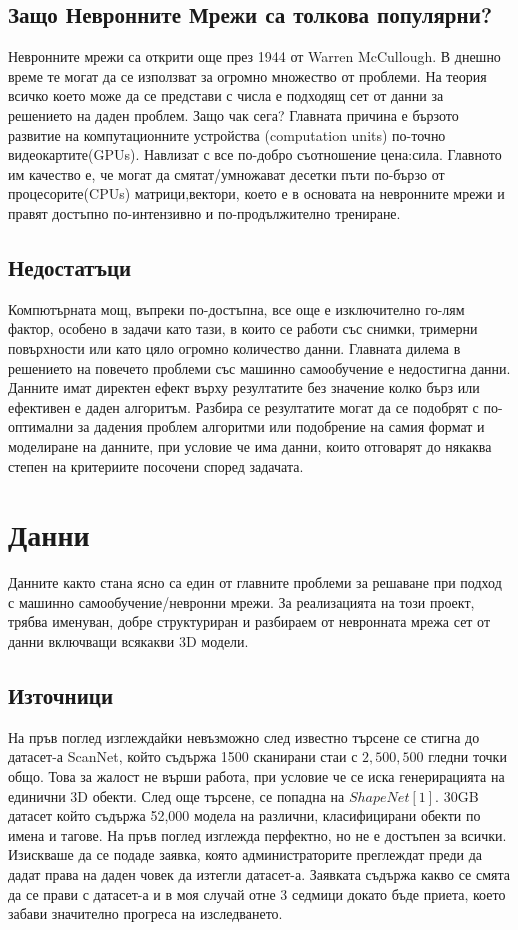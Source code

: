 \subsection{Защо Невронните Мрежи са толкова популярни?}
Невронните мрежи са открити още през 1944 от Warren McCullough.
В днешно време те могат да се използват за огромно множество от проблеми. На теория всичко което може да се представи с числа е подходящ сет от данни за решението на даден проблем. Защо чак сега? Главната причина е бързото развитие на компутационните устройства (computation units) по-точно видеокартите(GPUs). Навлизат с все по-добро съотношение цена:сила. Главното им качество е, че могат да смятат/умножават десетки пъти по-бързо от процесорите(CPUs) матрици,вектори, което е в основата на невронните мрежи и правят достъпно по-интензивно и по-продължително трениране.

\subsection{Недостатъци}
Компютърната мощ, въпреки по-достъпна, все още е изключително го-лям фактор, особено в задачи като тази, в които се работи със снимки, тримерни повърхности или като цяло огромно количество данни. Главната дилема в решението на повечето проблеми със машинно самообучение е недостигна данни. Данните имат директен ефект върху резултатите без значение колко бърз или ефективен е даден алгоритъм. Разбира се резултатите могат да се подобрят с по-оптимални за дадения проблем алгоритми или подобрение на самия формат и моделиране на данните, при условие че има данни, които отговарят до някаква степен на критериите посочени според задачата.

\section{Данни}

Данните както стана ясно са един от главните проблеми за решаване при подход с машинно самообучение/невронни мрежи. За реализацията на този проект, трябва именуван, добре структуриран и разбираем от невронната мрежа сет от данни включващи всякакви 3D модели. 

\subsection{Източници}
На пръв поглед изглеждайки невъзможно след известно търсене се стигна до датасет-а ScanNet, който съдържа 1500 сканирани стаи с $2,500,500$ гледни точки общо. Това за жалост не върши работа, при условие че се иска генерирацията на единични 3D обекти. След още търсене, се попадна на $ShapeNet[1]$. 30GB датасет който съдържа 52,000 модела на различни, класифицирани обекти по имена и тагове. На пръв поглед изглежда перфектно, но не е достъпен за всички. Изискваше да се подаде заявка, която администраторите преглеждат преди да дадат права на даден човек да изтегли датасет-а. Заявката съдържа какво се смята да се прави с датасет-а и в моя случай отне 3 седмици докато бъде приета, което забави значително прогреса на изследването.\\

